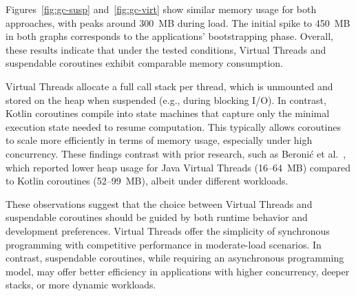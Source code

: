 Figures~\ref{fig:gc-susp} and~\ref{fig:gc-virt} show similar memory usage for
both approaches, with peaks around 300~MB during load. The initial spike to
450~MB in both graphs corresponds to the applications' bootstrapping phase.
Overall, these results indicate that under the tested conditions, Virtual
Threads and suspendable coroutines exhibit comparable memory consumption.

Virtual Threads allocate a full call stack per thread, which is unmounted and
stored on the heap when suspended (e.g., during blocking I/O). In contrast,
Kotlin coroutines compile into state machines that capture only the minimal
execution state needed to resume computation. This typically allows coroutines
to scale more efficiently in terms of memory usage, especially under high
concurrency. These findings contrast with prior research, such as Beronić et
al.~\cite{9803765}, which reported lower heap usage for Java Virtual Threads (16--64~MB)
compared to Kotlin coroutines (52--99~MB), albeit under different workloads.

These observations suggest that the choice between Virtual Threads and
suspendable coroutines should be guided by both runtime behavior and
development preferences. Virtual Threads offer the simplicity of synchronous
programming with competitive performance in moderate-load scenarios. In
contrast, suspendable coroutines, while requiring an asynchronous programming
model, may offer better efficiency in applications with higher concurrency,
deeper stacks, or more dynamic workloads.
